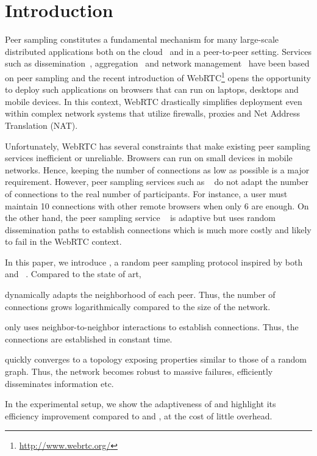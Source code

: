 
\section{Introduction}

Peer sampling constitutes a fundamental mechanism for many large-scale
distributed applications both on the
cloud~\cite{DeCandia:2007:DAH:1323293.1294281} and in a peer-to-peer
setting. Services such as dissemination~\cite{eugster2003lightweight,
  tolgyeski2009adaptive}, aggregation~\cite{jelasity2004epidemic} and
network management~\cite{jelasity2009tman, voulgaris2005epidemic} have
been based on peer sampling and the recent introduction of
WebRTC\footnote{\url{http://www.webrtc.org/}} opens the opportunity to
deploy such applications on browsers that can run on laptops, desktops
and mobile devices. In this context, WebRTC drastically simplifies
deployment even within complex network systems that utilize firewalls,
proxies and Net Address Translation (NAT).

Unfortunately, WebRTC has several constraints that make existing peer sampling
services inefficient or unreliable. Brow\-sers can run on small devices in
mobile networks. Hence, keeping the number of connections as low as possible is
a major requirement. However, peer sampling services such as
\CYCLON~\cite{voulgaris2005cyclon} do not adapt the number of connections to
the real number of participants. For instance, a user must maintain 10
connections with other remote browsers when only 6 are enough. On the other
hand, the peer sampling service \SCAMP~\cite{ganesh2003peer} is adaptive but
uses random dissemination paths to establish connections which is much more
costly and likely to fail in the WebRTC context.

In this paper, we introduce \SPRAY, a random peer sampling protocol inspired by
both \SCAMP~\cite{ganesh2003peer}
and \CYCLON~\cite{voulgaris2005cyclon}. Compared to the state of art,
\begin{inparaenum}[(i)]
\item \SPRAY dynamically adapts the neighborhood of each peer. Thus, the number
  of connections grows logarithmically compared to the size of the network.
\item \SPRAY only uses neighbor-to-neighbor interactions to establish
  connections. Thus, the connections are established in constant time.
\item \SPRAY quickly converges to a topology exposing properties similar to
  those of a random graph. Thus, the network becomes robust to massive
  failures, efficiently disseminates information etc.
\item In the experimental setup, we show the adaptiveness of \SPRAY and
  highlight its efficiency improvement compared to \CYCLON and \SCAMP, at the
  cost of little overhead.
\end{inparaenum}

